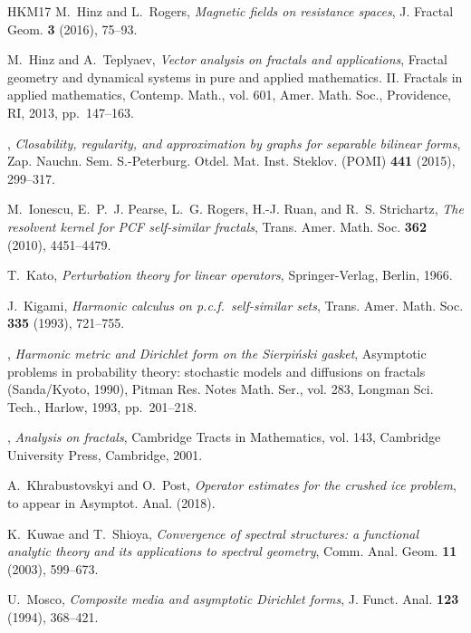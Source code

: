 \documentclass[12pt,reqno,a4paper]{amsart}            %
\numberwithin{equation}{section}
\theoremstyle{mythmstyle}       %
\theoremstyle{mydefstyle}        %
\newcommand{\1}{\mathbbm 1}                    %
\begin{document}
\begin{thebibliography}{HKM{\etalchar{+}}17}
M.~Hinz and L.~Rogers, \emph{Magnetic fields on resistance spaces}, J. Fractal
  Geom. \textbf{3} (2016), 75--93.

M.~Hinz and A.~Teplyaev, \emph{Vector analysis on fractals and applications},
  Fractal geometry and dynamical systems in pure and applied mathematics. {II}.
  {F}ractals in applied mathematics, Contemp. Math., vol. 601, Amer. Math.
  Soc., Providence, RI, 2013, pp.~147--163.

\bysame, \emph{Closability, regularity, and approximation by graphs for
  separable bilinear forms}, Zap. Nauchn. Sem. S.-Peterburg. Otdel. Mat. Inst.
  Steklov. (POMI) \textbf{441} (2015), 299--317.

M.~Ionescu, E.~P.~J. Pearse, L.~G. Rogers, H.-J. Ruan, and R.~S. Strichartz,
  \emph{The resolvent kernel for {PCF} self-similar fractals}, Trans. Amer.
  Math. Soc. \textbf{362} (2010), 4451--4479.

T.~Kato, \emph{Perturbation theory for linear operators}, Springer-Verlag,
  Berlin, 1966.

 J.~Kigami, \emph{Harmonic calculus on
    p.c.f.\ self-similar sets}, Trans. Amer.  Math. Soc. \textbf{335}
  (1993), 721--755.

 \bysame, \emph{Harmonic metric and
    {D}irichlet form on the {S}ierpi\'nski gasket}, Asymptotic
  problems in probability theory: stochastic models and diffusions on
  fractals ({S}anda/{K}yoto, 1990), Pitman Res. Notes Math. Ser.,
  vol. 283, Longman Sci. Tech., Harlow, 1993, pp.~201--218.

\bysame, \emph{Analysis on fractals}, Cambridge Tracts in Mathematics, vol.
  143, Cambridge University Press, Cambridge, 2001.

A.~Khrabustovskyi and O.~Post, \emph{Operator estimates for the crushed ice
  problem}, to appear in Asymptot. Anal. (2018).

K.~Kuwae and T.~Shioya, \emph{Convergence of spectral structures: a functional
  analytic theory and its applications to spectral geometry}, Comm. Anal. Geom.
  \textbf{11} (2003), 599--673.

U.~Mosco, \emph{Composite media and asymptotic {D}irichlet forms}, J. Funct.
  Anal. \textbf{123} (1994), 368--421.


\end{thebibliography}
\end{document}
